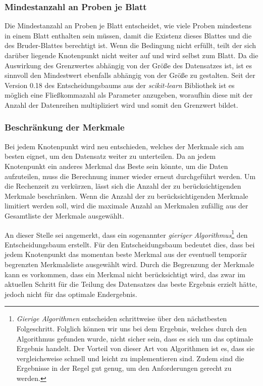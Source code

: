 \documentclass[12pt, a4paper]{article}
\begin{document}
\subsubsection{Mindestanzahl an Proben je Blatt} 

Die Mindestanzahl an Proben je Blatt entscheidet, wie viele Proben mindestens in einem Blatt enthalten sein müssen, damit die Existenz dieses Blattes und die des Bruder-Blattes berechtigt ist. Wenn die Bedingung nicht erfüllt, teilt der sich darüber liegende Knotenpunkt nicht weiter auf und wird selbst zum Blatt. Da die Auswirkung des Grenzwertes abhängig von der Größe des Datensatzes ist, ist es sinnvoll den Mindestwert ebenfalls abhängig von der Größe zu gestalten. Seit der Version 0.18 des Entscheidungsbaums aus der \textit{scikit-learn} Bibliothek ist es möglich eine Fließkommazahl als Parameter anzugeben, woraufhin diese mit der Anzahl der Datenreihen multipliziert wird und somit den Grenzwert bildet.

\subsubsection{Beschränkung der Merkmale}

Bei jedem Knotenpunkt wird neu entschieden, welches der Merkmale sich am besten eignet, um den Datensatz weiter zu unterteilen. Da an jedem Knotenpunkt ein anderes Merkmal das Beste sein könnte, um die Daten aufzuteilen, muss die Berechnung immer wieder erneut durchgeführt werden. Um die Rechenzeit zu verkürzen, lässt sich die Anzahl der zu berücksichtigenden Merkmale beschränken. Wenn die Anzahl der zu berücksichtigenden Merkmale limitiert werden soll, wird die maximale Anzahl an Merkmalen zufällig aus der Gesamtliste der Merkmale ausgewählt. 

An dieser Stelle sei angemerkt, dass ein sogenannter \textit{gieriger Algorithmus}\footnote{\textit{Gierige Algorithmen} entscheiden schrittweise über den nächstbesten Folgeschritt. Folglich können wir uns bei dem Ergebnis, welches durch den Algorithmus gefunden wurde, nicht sicher sein, dass es sich um das optimale Ergebnis handelt. Der Vorteil von dieser Art von Algorithmen ist es, dass sie vergleichsweise schnell und leicht zu implementieren sind. Zudem sind die Ergebnisse in der Regel gut genug, um den Anforderungen gerecht zu werden.} den Entscheidungsbaum erstellt. Für den Entscheidungsbaum bedeutet dies, dass bei jedem Knotenpunkt das momentan beste Merkmal aus der eventuell temporär begrenzten Merkmalsliste ausgewählt wird. Durch die Begrenzung der Merkmale kann es vorkommen, dass ein Merkmal nicht berücksichtigt wird, das zwar im aktuellen Schritt für die Teilung des Datensatzes das beste Ergebnis erzielt hätte, jedoch nicht für das optimale Endergebnis.
\end{document}
